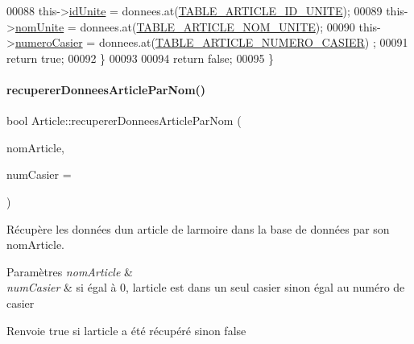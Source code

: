 \begin{DoxyCode}
00088         this->\hyperlink{class_article_a702cff16cb9cd0774383ceba81d83869}{idUnite} = donnees.at(\hyperlink{_article_8h_a159354683cfd6e1b578172fbe6490ab6aa27f54cec32c08b45beaf39f1259ae92}{TABLE\_ARTICLE\_ID\_UNITE});
00089         this->\hyperlink{class_article_a43a20e248e57150af0546c9f4b6b74c3}{nomUnite} = donnees.at(\hyperlink{_article_8h_a159354683cfd6e1b578172fbe6490ab6abc2184dab6c03e59872ced7183608174}{TABLE\_ARTICLE\_NOM\_UNITE});
00090         this->\hyperlink{class_article_a4b8dd9598cc16200c60c7f55196fc26d}{numeroCasier} = donnees.at(\hyperlink{_article_8h_a159354683cfd6e1b578172fbe6490ab6a43ae9bea39dd3f12e8732bcd2d7c0223}{TABLE\_ARTICLE\_NUMERO\_CASIER})
      ;
00091         \textcolor{keywordflow}{return} \textcolor{keyword}{true};
00092     \}
00093 
00094     \textcolor{keywordflow}{return} \textcolor{keyword}{false};
00095 \}
\end{DoxyCode}
\mbox{\label{class_article_a6eab145b46f5e1786c5ddf669ffabb6e}} 
\paragraph{\texorpdfstring{recuperer\+Donnees\+Article\+Par\+Nom()}{recupererDonneesArticleParNom()}}
{\footnotesize\ttfamily bool Article\+::recuperer\+Donnees\+Article\+Par\+Nom (\begin{DoxyParamCaption}\item[{Q\+String}]{nom\+Article,  }\item[{int}]{num\+Casier = {} }\end{DoxyParamCaption})}



Récupère les données d\textquotesingle{}un article de l\textquotesingle{}armoire dans la base de données par son nom\+Article. 


\begin{DoxyParams}{Paramètres}
{\em nom\+Article} & \\
\hline
{\em num\+Casier} & si égal à 0, l\textquotesingle{}article est dans un seul casier sinon égal au numéro de casier \\
\hline
\end{DoxyParams}
\begin{DoxyReturn}{Renvoie}
true si l\textquotesingle{}article a été récupéré sinon false 
\end{DoxyReturn}


